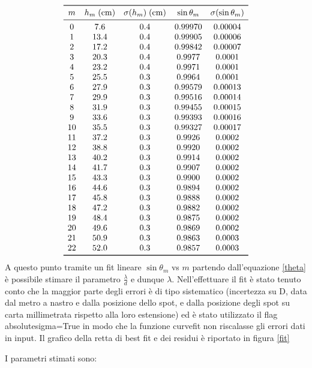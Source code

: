 \documentclass[10pt, a4paper, italian]{article}
\begin{document}
\[
\begin{array}{ccccc}
\toprule
m & h_m \; (\si{\centi \meter}) & \sigma(h_m) \; (\si{\centi \meter}) & \sin{\theta_m} & \sigma(\sin{\theta_m}) \\
\midrule
0&7.6     & 0.4 & 0.99970  & 0.00004 \\
1&13.4    & 0.4 & 0.99905  &  0.00006 \\
2&17.2    & 0.4 & 0.99842  &  0.00007\\
3&20.3    & 0.4&  0.9977  & 0.0001   \\
4&23.2    & 0.4&  0.9971 & 0.0001\\
5&25.5    & 0.3 & 0.9964 & 0.0001\\
6&27.9    & 0.3 & 0.99579 &0.00013\\
7&29.9    & 0.3 & 0.99516 & 0.00014 \\
8&31.9    & 0.3 & 0.99455 &0.00015\\
9&33.6    & 0.3 & 0.99393 &0.00016\\
10&35.5   & 0.3 & 0.99327 &0.00017\\
11&37.2   & 0.3& 0.9926  &0.0002 \\
12&38.8   & 0.3& 0.9920  & 0.0002\\
13&40.2   & 0.3& 0.9914 & 0.0002\\
14&41.7   & 0.3& 0.9907 & 0.0002 \\
15&43.3   & 0.3& 0.9900  &0.0002 \\
16&44.6  &  0.3& 0.9894  & 0.0002\\
17&45.8  &  0.3& 0.9888   &0.0002\\
18&47.2  &  0.3 & 0.9882  & 0.0002\\
19&48.4  &  0.3  & 0.9875  & 0.0002\\
20&49.6   &  0.3   &0.9869   & 0.0002\\ 
21&50.9   & 0.3    & 0.9863  &0.0003 \\
22&52.0   &  0.3 & 0.9857 & 0.0003\\
\bottomrule
\end{array}
\]
\vspace{0.2cm}
A questo punto tramite un fit lineare $\sin{\theta_m}$ vs $m$ partendo dall'equazione \eqref{theta} è possibile stimare il parametro $\frac{\lambda}{d}$ e dunque $\lambda$. Nell'effettuare il fit è stato tenuto conto che la maggior parte degli errori è di tipo sistematico (incertezza su D, data dal metro a nastro e dalla posizione dello spot, e dalla posizione degli spot su carta millimetrata rispetto alla loro estensione) ed è stato utilizzato il flag absolute\textunderscore sigma=True in modo che la funzione curve\textunderscore fit non riscalasse gli errori dati in input. \newline
Il grafico della retta di best fit e dei residui è riportato in figura \ref{fit}
\begin{center}
\end{center}
I parametri stimati sono:
\end{document}
